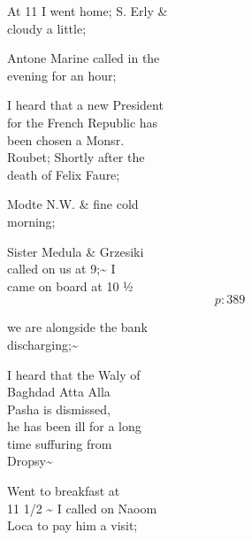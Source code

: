 \documentclass{report}
\begin{document}
	\par{
 	At 11 I went home; S. Erly \&\ \\cloudy a little;\ \\
	}

	\par{
 	Antone Marine called in the\ \\evening for an hour;\ \\
	}

	\par{
 	I heard that a new President\ \\for the French Republic has\ \\been chosen a Monsr.\ \\Roubet; Shortly after the\ \\death of Felix Faure;\ \\
	}

	\par{
 	Modte N.W. \& fine cold\ \\morning;\ \\
	}

	\par{
 	Sister Medula \& Grzesiki\ \\called on us at 9;\~{} I\ \\came on board at 10 ½\ \\
  \[p: 389 \]

	}




	\par{
 	we are alongside the bank\ \\discharging;\~{}\ \\
	}

	\par{
 	I heard that the Waly of\ \\Baghdad Atta Alla\ \\Pasha is dismissed,\ \\he has been ill for a long\ \\time suffuring from\ \\Dropsy\~{}\ \\
	}

	\par{
 	Went to breakfast at\ \\11 1/2 \~{} I called on Naoom\ \\Loca to pay him a visit;\ \\
	}
\end{document}
